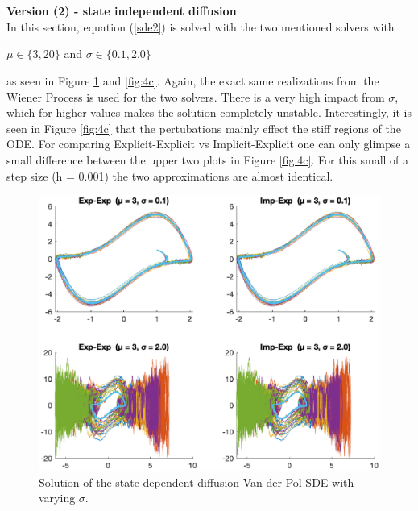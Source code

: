 \\\

\textbf{Version (2) - state independent diffusion}\\
In this section, equation (\ref{sde2}) is solved with the two mentioned solvers with\\
\begin{center}
$\mu \in \{3, 20\}$ and $\sigma \in \{0.1, 2.0\}$     
\end{center}
as seen in Figure \ref{fig:4d} and \ref{fig:4c}. Again, the exact same realizations from the Wiener Process is used for the two solvers. There is a very high impact from $\sigma$, which for higher values makes the solution completely unstable. Interestingly, it is seen in Figure \ref{fig:4c} that the pertubations mainly effect the stiff regions of the ODE. For comparing Explicit-Explicit vs Implicit-Explicit one can only glimpse a small difference between the upper two plots in Figure \ref{fig:4c}. For this small of a step size (h = 0.001) the two approximations are almost identical.

\begin{figure}[htb]
    \centering
    \includegraphics[width=\textwidth]{plots/4d.eps}
    \caption{Solution of the state dependent diffusion Van der Pol SDE with varying $\sigma$.}
    \label{fig:4d}
\end{figure}


